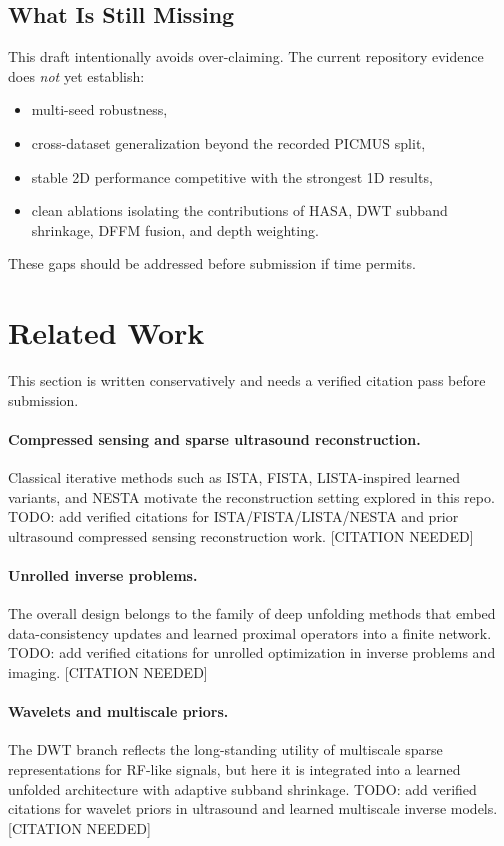 \documentclass{article}
\begin{document}
\subsection{What Is Still Missing}
This draft intentionally avoids over-claiming. The current repository evidence does \emph{not} yet establish:
\begin{itemize}[leftmargin=*, noitemsep]
  \item multi-seed robustness,
  \item cross-dataset generalization beyond the recorded PICMUS split,
  \item stable 2D performance competitive with the strongest 1D results,
  \item clean ablations isolating the contributions of HASA, DWT subband shrinkage, DFFM fusion, and depth weighting.
\end{itemize}
These gaps should be addressed before submission if time permits.

\section{Related Work}
This section is written conservatively and needs a verified citation pass before submission.

\paragraph{Compressed sensing and sparse ultrasound reconstruction.}
Classical iterative methods such as ISTA, FISTA, LISTA-inspired learned variants, and NESTA motivate the reconstruction setting explored in this repo. TODO: add verified citations for ISTA/FISTA/LISTA/NESTA and prior ultrasound compressed sensing reconstruction work. [CITATION NEEDED]

\paragraph{Unrolled inverse problems.}
The overall design belongs to the family of deep unfolding methods that embed data-consistency updates and learned proximal operators into a finite network. TODO: add verified citations for unrolled optimization in inverse problems and imaging. [CITATION NEEDED]

\paragraph{Wavelets and multiscale priors.}
The DWT branch reflects the long-standing utility of multiscale sparse representations for RF-like signals, but here it is integrated into a learned unfolded architecture with adaptive subband shrinkage. TODO: add verified citations for wavelet priors in ultrasound and learned multiscale inverse models. [CITATION NEEDED]
\end{document}
